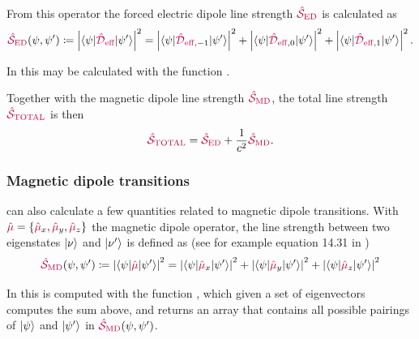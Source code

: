 \documentclass[11pt, twoside,openright]{article}
\begin{document}
From this operator the forced electric dipole line strength $\textcolor{purple}{\hat{\mathcal{S}}_\text{ED}}$ is calculated as
\begin{equation} \label{eqn:forced-ED-line-strength}
	\textcolor{purple}{\hat{\mathcal{S}}_\text{ED}}(\psi,\psi') \coloneqq \left| \langle \psi|\textcolor{purple}{{\textcolor{purple}{\hat{\mathcal{D}}}_\text{eff}}}|\psi'\rangle \right|^2 = \left| \langle \psi|\textcolor{purple}{{\textcolor{purple}{\hat{\mathcal{D}}}_\text{eff}}}_{,-1}|\psi'\rangle \right|^2 + \left| \langle \psi|\textcolor{purple}{{\textcolor{purple}{\hat{\mathcal{D}}}_\text{eff}}}_{,0}|\psi'\rangle \right|^2 + \left| \langle \psi|\textcolor{purple}{{\textcolor{purple}{\hat{\mathcal{D}}}_\text{eff}}}_{,1}|\psi'\rangle \right|^2.
\end{equation}

In \qlanth this may be calculated with the function .

Together with the magnetic dipole line strength $\textcolor{purple}{\hat{\mathcal{S}}_\text{MD}}$, the total line strength $\textcolor{purple}{\hat{\mathcal{S}}_\text{TOTAL}}$ is then 
\begin{equation} \label{eqn:total-line-strength}
	\textcolor{purple}{\hat{\mathcal{S}}_\text{TOTAL}} = \textcolor{purple}{\hat{\mathcal{S}}_\text{ED}} + \frac{1}{c^2} \textcolor{purple}{\hat{\mathcal{S}}_\text{MD}}.
\end{equation}

 

 

\subsubsection{Magnetic dipole transitions}

\qlanth can also calculate a few quantities related to magnetic dipole transitions. With $\textcolor{purple}{\hat{\mu}} = \{\textcolor{purple}{\hat{\mu}}_x, \textcolor{purple}{\hat{\mu}}_y, \textcolor{purple}{\hat{\mu}}_z\}$ the magnetic dipole operator, the line strength between two eigenstates $|\nu\rangle$ and $|\nu'\rangle$ is defined as (see for example equation 14.31 in \cite{cowan_theory_1981})
\begin{equation}
	\textcolor{purple}{\hat{\mathcal{S}}_\text{MD}}(\psi,\psi') \coloneqq \left| \langle \psi|\textcolor{purple}{\hat{\mu}}|\psi'\rangle \right|^2 = \left| \langle \psi|\textcolor{purple}{\hat{\mu}}_x|\psi'\rangle \right|^2 + \left| \langle \psi|\textcolor{purple}{\hat{\mu}}_y|\psi'\rangle \right|^2 + \left| \langle \psi|\textcolor{purple}{\hat{\mu}}_z|\psi'\rangle \right|^2
\end{equation}

In \qlanth this is computed with the function , which given a set of eigenvectors computes the sum above, and returns an array that contains all possible pairings of $|\psi\rangle$ and $|\psi'\rangle$ in $\textcolor{purple}{\hat{\mathcal{S}}_\text{MD}}(\psi,\psi')$.
 
\end{document}
